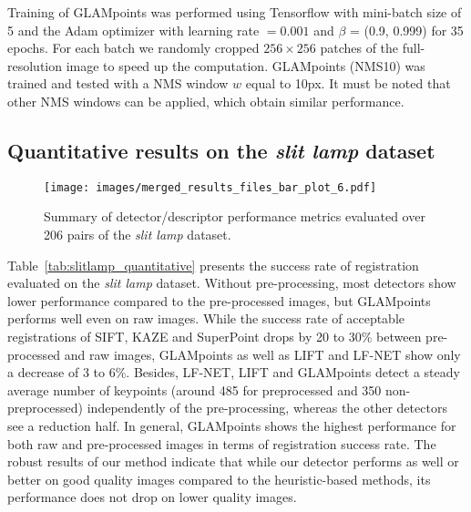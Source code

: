 Training of \ac{GLAMpoints} was performed using Tensorflow \cite{tensorflow2015-whitepaper} with mini-batch size of 5 and the Adam optimizer \cite{Kingma2015} with learning rate $= 0.001$ and $\beta$ = (0.9, 0.999) for 35 epochs. For each batch we randomly cropped $256\times 256$ patches of the full-resolution image to speed up the computation. \ac{GLAMpoints} (NMS10) was trained and tested with a \ac{NMS} window $w$ equal to 10px. It must be noted that other \ac{NMS} windows can be applied, which obtain similar performance.

\subsection{Quantitative results on the \textbf{\textit{slit lamp}} dataset}

\begin{figure*}
    \centering
    \texttt{[image: images/merged\_results\_files\_bar\_plot\_6.pdf]}
    \caption{Summary of detector/descriptor performance metrics evaluated over 206 pairs of the \textit{slit lamp} dataset.}
    \label{results-slitlamp}
\end{figure*}


Table~\ref{tab:slitlamp_quantitative} presents the success rate of registration evaluated on the \textit{slit lamp} dataset. Without pre-processing, most detectors show lower performance compared to the pre-processed images, but GLAMpoints performs well even on raw images. While the success rate of acceptable registrations of \ac{SIFT}, KAZE and SuperPoint drops by 20 to 30\% between pre-processed and raw images, \ac{GLAMpoints} as well as \ac{LIFT} and \ac{LF-NET} show only a decrease of 3 to 6\%. Besides, \ac{LF-NET}, \ac{LIFT} and \ac{GLAMpoints} detect a steady average number of keypoints (around 485 for preprocessed and 350 non-preprocessed) independently of the pre-processing, whereas the other detectors see a reduction half. In general, GLAMpoints shows the highest performance for both raw and pre-processed images in terms of registration success rate. The robust results of our method indicate that while our detector performs as well or better on good quality images compared to the heuristic-based methods, its performance does not drop on lower quality images.



